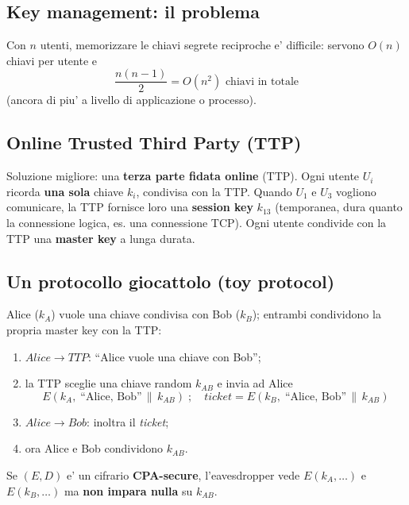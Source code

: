 \subsection{Key management: il problema}
Con $ n $ utenti, memorizzare le chiavi segrete reciproche e' difficile: servono $ O(n) $ chiavi per utente e
\[
  \frac{n(n-1)}{2} = O(n^2) \text{ chiavi in totale}
\]
(ancora di piu' a livello di applicazione o processo).

\subsection{Online Trusted Third Party (TTP)}
Soluzione migliore: una \textbf{terza parte fidata online} (TTP). Ogni utente $ U_i $ ricorda \textbf{una sola} chiave $ k_i $, condivisa con la TTP. Quando $ U_1 $ e $ U_3 $ vogliono comunicare, la TTP fornisce loro una \textbf{session key} $ k_{13} $ (temporanea, dura quanto la connessione logica, es. una connessione TCP). Ogni utente condivide con la TTP una \textbf{master key} a lunga durata.

\subsection{Un protocollo giocattolo (toy protocol)}
Alice ($ k_A $) vuole una chiave condivisa con Bob ($ k_B $); entrambi condividono la propria master key con la TTP:
\begin{enumerate}
  \item $ Alice \to TTP $: ``Alice vuole una chiave con Bob'';
  \item la TTP sceglie una chiave random $ k_{AB} $ e invia ad Alice
    \[
      E(k_A,\; \text{``Alice, Bob''} \,\|\, k_{AB}) \;;\quad \textit{ticket} = E(k_B,\; \text{``Alice, Bob''} \,\|\, k_{AB})
    \]
  \item $ Alice \to Bob $: inoltra il \textit{ticket};
  \item ora Alice e Bob condividono $ k_{AB} $.
\end{enumerate}
Se $ (E, D) $ e' un cifrario \textbf{CPA-secure}, l'eavesdropper vede $ E(k_A, \dots) $ e $ E(k_B, \dots) $ ma \textbf{non impara nulla} su $ k_{AB} $.

